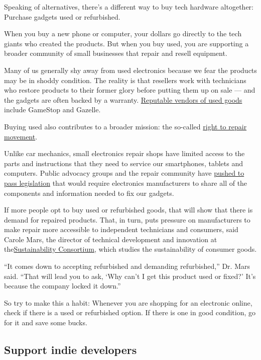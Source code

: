 Speaking of alternatives, there's a different way to buy tech hardware
altogether: Purchase gadgets used or refurbished.

When you buy a new phone or computer, your dollars go directly to the
tech giants who created the products. But when you buy used, you are
supporting a broader community of small businesses that repair and
resell equipment.

Many of us generally shy away from used electronics because we fear the
products may be in shoddy condition. The reality is that resellers work
with technicians who restore products to their former glory before
putting them up on sale --- and the gadgets are often backed by a
warranty.
\href{https://www.nytimes.com/2016/04/28/technology/personaltech/taking-the-stigma-out-of-buying-usedelectronics.html}{Reputable
vendors of used goods} include GameStop and Gazelle.

Buying used also contributes to a broader mission: the so-called
\href{https://www.ifixit.com/Right-to-Repair/Intro}{right to repair
movement}.

Unlike car mechanics, small electronics repair shops have limited access
to the parts and instructions that they need to service our smartphones,
tablets and computers. Public advocacy groups and the repair community
have
\href{https://uspirg.org/blogs/blog/usp/right-repair-wraps-big-year}{pushed
to pass legislation} that would require electronics manufacturers to
share all of the components and information needed to fix our gadgets.

If more people opt to buy used or refurbished goods, that will show that
there is demand for repaired products. That, in turn, puts pressure on
manufacturers to make repair more accessible to independent technicians
and consumers, said Carole Mars, the director of technical development
and innovation at
the\href{https://www.sustainabilityconsortium.org/}{Sustainability
Consortium}, which studies the sustainability of consumer goods.

``It comes down to accepting refurbished and demanding refurbished,''
Dr. Mars said. ``That will lead you to ask, `Why can't I get this
product used or fixed?' It's because the company locked it down.''

So try to make this a habit: Whenever you are shopping for an electronic
online, check if there is a used or refurbished option. If there is one
in good condition, go for it and save some bucks.

\hypertarget{support-indie-developers}{%
\subsection{Support indie developers}\label{support-indie-developers}}

